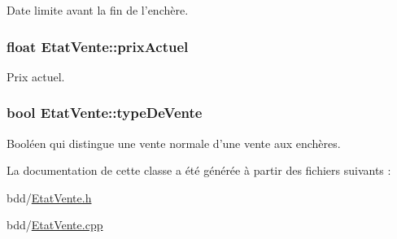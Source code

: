 Date limite avant la fin de l'enchère. 

\hypertarget{class_etat_vente_a69258e9f4890fc1fe84e5afdba35bc0f}{
\subsubsection[{prix\-Actuel}]{\setlength{\rightskip}{0pt plus 5cm}float Etat\-Vente\-::prix\-Actuel\hspace{0.3cm}{\ttfamily [protected]}}}\label{class_etat_vente_a69258e9f4890fc1fe84e5afdba35bc0f}


Prix actuel. 

\hypertarget{class_etat_vente_a6fac909bb6c53a68450ff1f1e287e298}{
\subsubsection[{type\-De\-Vente}]{\setlength{\rightskip}{0pt plus 5cm}bool Etat\-Vente\-::type\-De\-Vente\hspace{0.3cm}{\ttfamily [protected]}}}\label{class_etat_vente_a6fac909bb6c53a68450ff1f1e287e298}


Booléen qui distingue une vente normale d'une vente aux enchères. 



La documentation de cette classe a été générée à partir des fichiers suivants \-:\begin{DoxyCompactItemize}
\item 
bdd/\hyperlink{_etat_vente_8h}{Etat\-Vente.\-h}\item 
bdd/\hyperlink{_etat_vente_8cpp}{Etat\-Vente.\-cpp}\end{DoxyCompactItemize}
